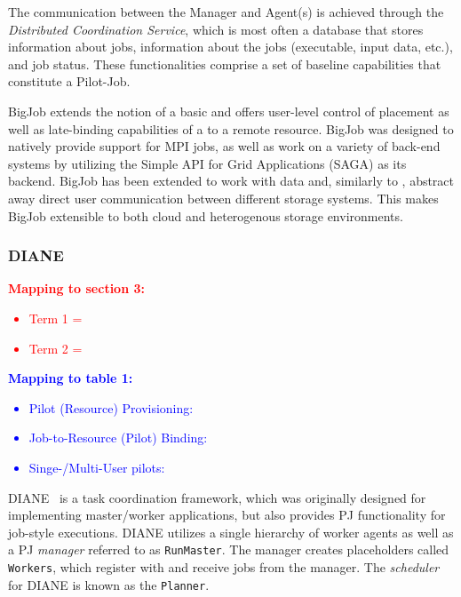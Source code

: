 \documentclass{sig-alternate}
\begin{document}
The communication between the Manager and Agent(s) is achieved through
the {\it Distributed Coordination Service}, which is most often a
database that stores information about jobs, information about the
jobs (executable, input data, etc.), and job status. These
functionalities comprise a set of baseline capabilities that
constitute a Pilot-Job.

BigJob extends the notion of a basic \pilotjob and offers user-level
control of \pilot placement as well as late-binding capabilities of a
\pilot to a remote resource. BigJob was designed to natively provide
support for MPI jobs, as well as work on a variety of back-end systems
by utilizing the Simple API for Grid Applications (SAGA) as its
backend. BigJob has been extended to work with data and, similarly to
\pilotjobs, abstract away direct user communication between different
storage systems. This makes BigJob extensible to both cloud and
heterogenous storage environments.

\subsubsection{DIANE}

\textcolor{red}
{
\textbf{Mapping to section 3:}
\begin{itemize}
\item Term 1 =
\item Term 2 =
\end{itemize}
}

\textcolor{blue}
{
\textbf{Mapping to table 1:}
\begin{itemize}
\item Pilot (Resource) Provisioning:
\item Job-to-Resource (Pilot) Binding:
\item Singe-/Multi-User pilots:
\end{itemize}
}



DIANE~\cite{Moscicki:908910} is a task coordination framework, which
was originally designed for implementing master/worker applications,
but also provides PJ functionality for job-style executions.
DIANE utilizes a single hierarchy of worker agents as well as a PJ \textit{manager}
referred to as \texttt{RunMaster}.  The manager creates
placeholders called \texttt{Workers}, which register with and receive jobs from the manager.
The \textit{scheduler} for DIANE is known as the \texttt{Planner}.
\end{document}
